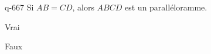 \begin{truefalse}{q-667}
Si $AB=CD$, alors $ABCD$ est un paralléloramme.
\item Vrai
\item* Faux
\end{truefalse}

